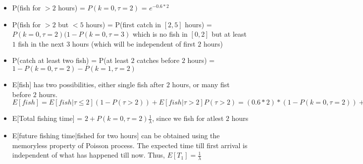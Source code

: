 \documentclass[../../probability-notes.tex]{subfile}
\begin{document}
        \begin{itemize}
            \item P(fish for $> 2$ hours) = $P(k=0, \tau=2)$ = $e^{-0.6 * 2}$
            \item P(fish for $> 2$ but $< 5$ hours) = P(first catch in $[2,5]$ hours) = $P(k=0,\tau=2)(1-P(k=0,\tau=3)$ which is no fish in $[0,2]$ but at least $1$ fish in the next $3$ hours (which will be independent of first $2$ hours)
            \item P(catch at least two fish) = P(at least $2$ catches before $2$ hours) = $1 - P(k=0,\tau=2) - P(k=1,\tau=2)$
            \item E[fish] has two possibilities, either single fish after $2$ hours, or many fist before $2$ hours. $E[fish] = E[fish|\tau \leq 2](1-P(\tau > 2)) + E[fish|\tau > 2] P(\tau > 2) = (0.6*2)*(1-P(k=0,\tau=2)) + 1*P(k=0,\tau=2)$
            \item E[Total fishing time] = $2 + P(k=0,\tau=2)\frac{1}{\lambda}$, since we fish for atlest $2$ hours
            \item E[future fishing time|fished for two hours] can be obtained using the memoryless property of Poisson process. The expected time till first arrival is independent of what has happened till now. Thus, $E[T_{1}] = \frac{1}{\lambda}$
        \end{itemize}
\end{document}
